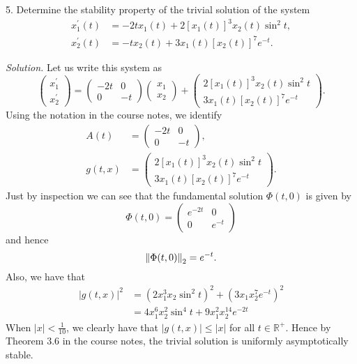 \documentclass{article}
\newcommand{\R}{\mathbb{R}}
\begin{document}
\newpage

5. Determine the stability property of the trivial solution of the system
%
\begin{align*}
    x_1^\prime(t) &= -2t x_1(t) + 2 [x_1(t)]^3 x_2(t) \sin^2 t, \\
    x_2^\prime(t) &= -t x_2(t) + 3 x_1(t) [x_2(t)]^7 e^{-t}.
\end{align*}

\textit{Solution.}
Let us write this system as
%
\begin{equation*}
    \begin{pmatrix}
        x_1^\prime \\
        x_2^\prime
    \end{pmatrix}
    =
    \begin{pmatrix}
        -2t & 0 \\
        0 & -t
    \end{pmatrix}
    \begin{pmatrix}
        x_1 \\
        x_2
    \end{pmatrix}
    +
    \begin{pmatrix}
        2 [x_1(t)]^3 x_2(t) \sin^2 t \\
        3 x_1(t) [x_2(t)]^7 e^{-t}
    \end{pmatrix}
    .
\end{equation*}
%
Using the notation in the course notes, we identify
%
\begin{align*}
    A(t) &=
    \begin{pmatrix}
        -2t & 0 \\
        0 & -t
    \end{pmatrix},
    \\
    g(t, x) &=
    \begin{pmatrix}
        2 [x_1(t)]^3 x_2(t) \sin^2 t \\
        3 x_1(t) [x_2(t)]^7 e^{-t}
    \end{pmatrix}
    .
\end{align*}
%
Just by inspection we can see that the fundamental solution $\Phi(t, 0)$
is given by
%
\begin{equation*}
    \Phi(t, 0) =
    \begin{pmatrix}
        e^{-2t} & 0 \\
        0 & e^{-t}
    \end{pmatrix}
\end{equation*}
%
and hence
%
\begin{equation*}
    \enVert[0]{\Phi(t, 0)}_2 = e^{-t}
    .
\end{equation*}
%
Also, we have that
%
\begin{align*}
    |g(t, x)|^2 &=
        (2 x_1^3 x_2 \sin^2 t)^2
        +
        (3 x_1 x_2^7 e^{-t})^2
        \\
        &=
        4 x_1^6 x_2^2 \sin^4 t
        +
        9 x_1^2 x_2^{14} e^{-2t}
\end{align*}
%
When $|x| < \frac{1}{10}$, we clearly have that $|g(t, x)| \leq |x|$ for all $t \in \R^+$.
Hence by Theorem $3.6$ in the course notes, the trivial solution is uniformly asymptotically stable.
\end{document}
